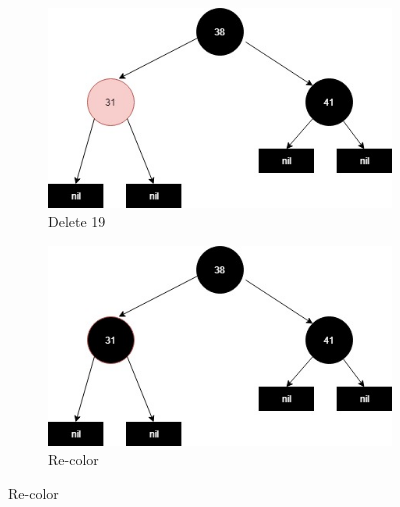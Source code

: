 \documentclass[20pt]{article} %
\begin{document}
\begin{figure}[!htbp]
   	\begin{subfigure}[p]{0.4\linewidth}
    	\includegraphics[width=\linewidth]{a4-1.jpg}
     	\caption{Delete 19}
   	\end{subfigure}
  	\begin{subfigure}[p]{0.4\linewidth}
    	\includegraphics[width=\linewidth]{a4-2.jpg}
    	\caption{Re-color}
  	\end{subfigure}


\end{figure}
\end{document}
